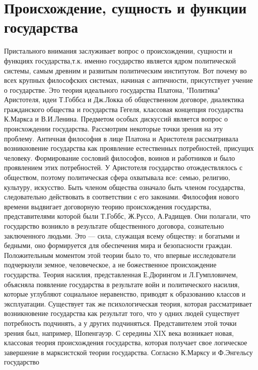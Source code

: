 \documentclass[12pt]{article}
\begin{document}
\section{Происхождение, сущность и функции государства}
Пристального внимания заслуживает вопрос о происхождении, сущности и функциях государства,т.к. именно
государство является ядром политической системы, самым древним и развитым политическим институтом. Вот
почему во всех крупных философских системах, начиная с античности, присутствует учение о государстве. Это
теория идеального государства Платона, "Политика" Аристотеля, идеи Т.Гоббса и Дж.Локка об общественном
договоре, диалектика гражданского общества и государства Гегеля, классовая концепция государства К.Маркса
и В.И.Ленина.
Предметом особых дискуссий является вопрос о происхождении государства. Рассмотрим некоторые точки
зрения на эту проблему. Античная философия в лице Платона и Аристотеля рассматривала возникновение
государства  как  проявление  естественных  потребностей,  присущих  человеку.  Формирование  сословий
философов,  воинов  и  работников  и  было  проявлением  этих  потребностей.  У  Аристотеля  государство
отождествлялось  с  обществом,  поэтому  политическая  сфера  охватывала  все:  семью,  религию,  культуру,
искусство. Быть членом общества означало быть членом государства, следовательно действовать в соответствии
с  его  законами.  Философия  нового  времени  выдвигает  договорную  теорию  происхождения  государства,
представителями  которой  были  Т.Гоббс,  Ж.Руссо,  А.Радищев.  Они  полагали,  что  государство  возникло  в
результате общественного договора, сознательно заключенного людьми. Это --- сила, служащая всему обществу:
и богатыми и бедными, оно формируется для обеспечения мира и безопасности граждан. Положительным
моментом  этой  теории  было  то,  что  впервые  исследователи  подчеркнули  земное,  человеческое,  а  не
божественное происхождение государства.
Теория насилия, представленная Е.Дюрингом и Л.Гумпловичем, объясняла появление государства в результате
войн и политического насилия, которые углубляют социальное неравенство, приводят к образованию классов и
эксплуатации.
Существует так же психологическая теория, которая рассматривает возникновение государства как результат
того, что у одних людей существует потребность подчинять, а у других подчиняться. Представителем этой
точки зрения был, например, Шопенгауэр.
С середины XIX века возникает новая, классовая теория происхождения государства, которая получает свое
логическое  завершение  в  марксистской  теории  государства.  Согласно  К.Марксу  и  Ф.Энгельсу  государство
\end{document}
